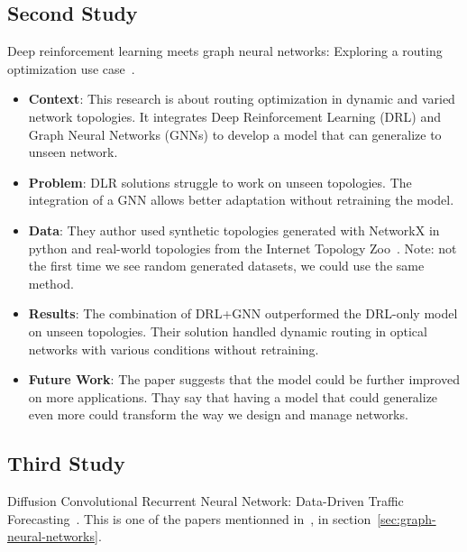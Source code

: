 \documentclass[conference]{IEEEtran}
\begin{document}
    \subsection{Second Study}\label{subsec:second-study}
    Deep reinforcement learning meets graph neural networks: Exploring a routing optimization use case~\cite{ALMASAN2022184}.

    \begin{itemize}
        \item \textbf{Context}:
        This research is about routing optimization in dynamic and varied network topologies.
        It integrates Deep Reinforcement Learning (DRL) and Graph Neural Networks (GNNs) to develop a model that can generalize to unseen network.
        \item \textbf{Problem}:
        DLR solutions struggle to work on unseen topologies.
        The integration of a GNN allows better adaptation without retraining the model.
        \item \textbf{Data}:
        They author used synthetic topologies generated with NetworkX in python and real-world topologies from the Internet Topology Zoo~\cite{6027859}.
        Note: not the first time we see random generated datasets, we could use the same method.
        \item \textbf{Results}:
        The combination of DRL+GNN outperformed the DRL-only model on unseen topologies.
        Their solution handled dynamic routing in optical networks with various conditions without retraining.
        \item \textbf{Future Work}:
        The paper suggests that the model could be further improved on more applications.
        Thay say that having a model that could generalize even more could transform the way we design and manage networks.
    \end{itemize}

    \subsection{Third Study}\label{subsec:third-study}
    Diffusion Convolutional Recurrent Neural Network: Data-Driven Traffic Forecasting~\cite{li2018diffusion}.
    This is one of the papers mentionned in~\cite{Wu_2021}, in section~\ref{sec:graph-neural-networks}.
\end{document}
